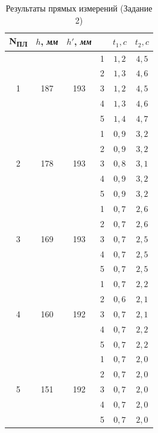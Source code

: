 \documentclass[11pt]{article}
\begin{document}
{\renewcommand{\arraystretch}{1.3}
\pagebreak
\begin{table}[htb]
	\caption{Результаты прямых измерений (Задание 2)}
	\centering
	\large
	\begin{tabular}{|c|c|c|c|c|c|}
		\hline
		N\textsubscript{ПЛ} & $h$,  \textit{мм}& $h'$,  \textit{мм}& \textnumero & $t_1, c$ & $t_2, c$\\
		\hline
		\multirow{5}{*}{1} & \multirow{5}{*}{187} & \multirow{5}{*}{193} & 1 & $1,2$ & $4,5$\\	
		\cline{4-6}
		&&& 2 & $1,3$ & $4,6$\\
		\cline{4-6}
		&&& 3 & $1,2$ & $4,5$\\
		\cline{4-6}
		&&& 4 & $1,3$ & $4,6$\\
		\cline{4-6}
		&&& 5 & $1,4$ & $4,7$\\
		\hline
		\multirow{5}{*}{2} & \multirow{5}{*}{178} & \multirow{5}{*}{193} & 1 & $0,9$ & $3,2$\\	
		\cline{4-6}
		&&& 2 & $0,9$ & $3,2$\\
		\cline{4-6}
		&&& 3 & $0,8$ & $3,1$\\
		\cline{4-6}
		&&& 4 & $0,9$ & $3,2$\\
		\cline{4-6}
		&&& 5 & $0,9$ & $3,2$\\
		\hline
		\multirow{5}{*}{3} & \multirow{5}{*}{169} & \multirow{5}{*}{193} & 1 & $0,7$ & $2,6$\\	
		\cline{4-6}
		&&& 2 & $0,7$ & $2,6$\\
		\cline{4-6}
		&&& 3 & $0,7$ & $2,5$\\
		\cline{4-6}
		&&& 4 & $0,7$ & $2,5$\\
		\cline{4-6}
		&&& 5 & $0,7$ & $2,5$\\
		\hline
		\multirow{5}{*}{4} & \multirow{5}{*}{160} & \multirow{5}{*}{192} & 1 & $0,7$ & $2,2$\\	
		\cline{4-6}
		&&& 2 & $0,6$ & $2,1$\\
		\cline{4-6}
		&&& 3 & $0,7$ & $2,1$\\
		\cline{4-6}
		&&& 4 & $0,7$ & $2,2$\\
		\cline{4-6}
		&&& 5 & $0,7$ & $2,2$\\
		\hline
		\multirow{5}{*}{5} & \multirow{5}{*}{151} & \multirow{5}{*}{192} & 1 & $0,7$ & $2,0$\\	
		\cline{4-6}
		&&& 2 & $0,7$ & $2,0$\\
		\cline{4-6}
		&&& 3 & $0,7$ & $2,0$\\
		\cline{4-6}
		&&& 4 & $0,7$ & $2,0$\\
		\cline{4-6}
		&&& 5 & $0,7$ & $2,0$\\
		\hline
	\end{tabular}
\end{table}
}
\end{document}
